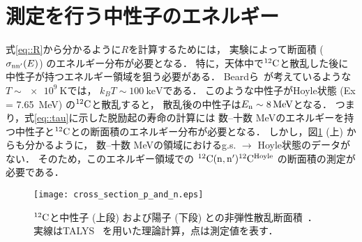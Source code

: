 \documentclass[../master]{subfiles}
\begin{document}
\section{測定を行う中性子のエネルギー}
式\eqref{eq::R}から分かるように$R$を計算するためには，
実験によって断面積 ($\sigma_{\rm nn'} (E)$) のエネルギー分布が必要となる．
特に，天体中で${}^{12}{\rm C}$と散乱した後に中性子が持つエネルギー領域を狙う必要がある．
Beardら~\cite{hotdensemedium}が考えているような$T\sim\SI{e9}{\kelvin}$では，
$k_{B}T\sim\SI{100}{\kilo\electronvolt}$である．%
このような中性子がHoyle状態 (Ex = \SI{7.65}{\mega\electronvolt}) の${}^{12}{\rm C}$と散乱すると，
散乱後の中性子は$E_{\rm n}\sim\SI{8}{\mega\electronvolt}$となる．
つまり，式\eqref{eq::tau}に示した脱励起の寿命の計算には
数--十数 \si{\mega\electronvolt}のエネルギーを持つ中性子と${}^{12}{\rm C}$との断面積のエネルギー分布が必要となる．
しかし，図\ref{fig::crosssection_pres} (上) からも分かるように，
数--十数 \si{\mega\electronvolt}の領域におけるg.s. $\rightarrow$ Hoyle状態のデータがない．
そのため，このエネルギー領域での ${}^{12}{\rm C}({\rm n,n'}){}^{12}{\rm C}^{{\rm Hoyle}}$ の断面積の測定が必要である．
\begin{figure}
  \centering
  \texttt{[image: cross\_section\_p\_and\_n.eps]}
  \caption[${}^{12}{\rm C}$と中性子 (上段) および陽子 (下段) との非弾性散乱断面積．]
          {${}^{12}{\rm C}$と中性子 (上段) および陽子 (下段) との非弾性散乱断面積~\cite{hotdensemedium}．
  実線はTALYS~\cite{talys-1.0} を用いた理論計算，点は測定値を表す．}
  \label{fig::crosssection_pres}
\end{figure}
\end{document}
